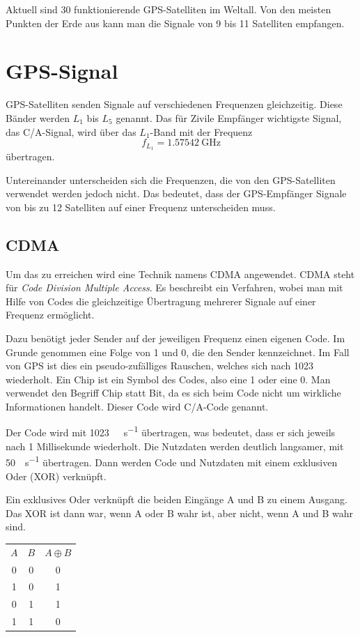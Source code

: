 \documentclass[12pt,a4paper]{scrartcl}
\begin{document}
Aktuell sind 30 funktionierende GPS-Satelliten im Weltall. Von den meisten Punkten der Erde aus kann man die Signale von 9 bis 11 Satelliten empfangen.

\section{GPS-Signal}
GPS-Satelliten senden Signale auf verschiedenen Frequenzen gleichzeitig. Diese Bänder werden $L_1$ bis $L_5$ genannt. Das für Zivile Empfänger wichtigste Signal, das C/A-Signal, wird über das $L_1$-Band mit der Frequenz
\begin{equation}
f_{L_1} = \SI{1.57542}{\giga\hertz} \nonumber
\end{equation}
übertragen.

Untereinander unterscheiden sich die Frequenzen, die von den GPS-Satelliten verwendet werden jedoch nicht. Das bedeutet, dass der GPS-Empfänger Signale von bis zu 12 Satelliten auf einer Frequenz unterscheiden muss.

\subsection{CDMA}

Um das zu erreichen wird eine Technik namens CDMA angewendet.
CDMA steht für \emph{Code Division Multiple Access}. Es beschreibt ein Verfahren, wobei man mit Hilfe von Codes die gleichzeitige Übertragung mehrerer Signale auf einer Frequenz ermöglicht.

Dazu benötigt jeder Sender auf der jeweiligen Frequenz einen eigenen Code. Im Grunde genommen eine Folge von 1 und 0, die den Sender kennzeichnet. Im Fall von GPS ist dies ein pseudo-zufälliges Rauschen, welches sich nach \SI{1023}{\chip} wiederholt. Ein Chip ist ein Symbol des Codes, also eine 1 oder eine 0. Man verwendet den Begriff Chip statt Bit, da es sich beim Code nicht um wirkliche Informationen handelt. Dieser Code wird C/A-Code genannt.

Der Code wird mit \SI{1023}{\mega\chip\per\second} übertragen, was bedeutet, dass er sich jeweils nach 1 Millisekunde wiederholt.
Die Nutzdaten werden deutlich langsamer, mit \SI{50}{\bit\per\second} übertragen. Dann werden Code und Nutzdaten mit einem exklusiven Oder (XOR) verknüpft.

Ein exklusives Oder verknüpft die beiden Eingänge A und B zu einem Ausgang. Das XOR ist dann war, wenn A oder B wahr ist, aber nicht, wenn A und B wahr sind.

\begin{center}
\begin{tabular}{cc|c}
\textbf{$A$} & \textbf{$B$} & \textbf{$A\oplus B$} \\
0 & 0 & 0 \\
1 & 0 & 1 \\
0 & 1 & 1 \\
1 & 1 & 0 \\
\end{tabular}
\end{center}
\end{document}
